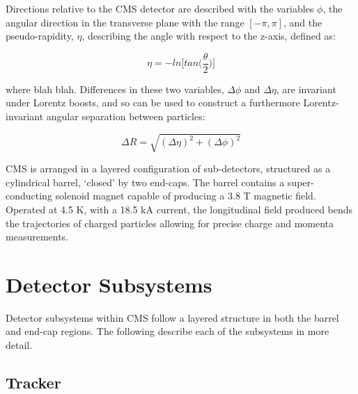 Directions relative to the CMS detector are described with the variables $\phi$,
the angular direction in the transverse plane with the range $[-\pi, \pi]$, and 
the pseudo-rapidity, $\eta$, describing the angle with respect to the z-axis,
defined as:

\begin{equation}
\eta = - ln \Bigg[ tan \Bigg( \frac{\theta}{2} \Bigg) \Bigg]
\end{equation}

where blah blah. Differences in these two variables, $\Delta \phi$ and $\Delta 
\eta$, are invariant under Lorentz boosts, and so can be used to construct a 
furthermore Lorentz-invariant angular separation between particles:

\begin{equation}
\Delta R = \sqrt{ (\Delta \eta)^2 + (\Delta \phi)^2}
\end{equation}

CMS is arranged in a layered configuration of sub-detectors, structured as a 
cylindrical barrel, `closed' by two end-caps. The barrel contains a
super-conducting solenoid magnet capable of producing a 3.8 T magnetic field. 
Operated at 4.5 K, with a 18.5 kA current, the longitudinal field produced bends
the trajectories of charged particles allowing for precise charge and momenta 
measurements.

\section{Detector Subsystems}  %
\label{sec:detector_subsystems}

Detector subsystems within CMS follow a layered structure in both the barrel and
end-cap regions. The following describe each of the subsystems in more detail.

\subsection{Tracker}



